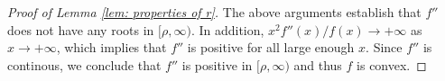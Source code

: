 \documentclass[10pt,a4paper]{amsart}
\begin{document}
\begin{proof}[Proof of Lemma \ref{lem: properties of r}]
	The above arguments establish that $f''$ does not have any roots in $[\rho, \infty)$. In addition, $x^2 f''(x) / f(x) \to +\infty$ as $x \to +\infty$, which implies that $f''$ is positive for all large enough $x$. Since $f''$ is continous, we conclude that $f''$ is positive in $[\rho, \infty)$ and thus $f$ is convex.
\end{proof}
\end{document}
